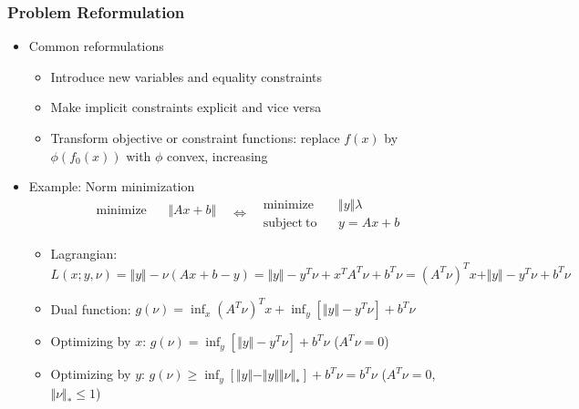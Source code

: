 \subsubsection*{Problem Reformulation}
\begin{itemize}
    \item Common reformulations
    \begin{itemize}
        \item Introduce new variables and equality constraints
        \item Make implicit constraints explicit and vice versa
        \item Transform objective or constraint functions: replace $f(x)$ by $\phi(f_0(x))$ with $\phi$ convex, increasing
    \end{itemize}
    \item Example: Norm minimization
        $$ \begin{aligned}
            \mathrm{minimize}~~&~~\Vert Ax+b \Vert \\ {}
        \end{aligned}~~~\Leftrightarrow~~~\begin{aligned}
            \mathrm{minimize}~~&~~\Vert y\Vert\lambda \\
            \mathrm{subject~to}~~&~~y = Ax + b
        \end{aligned} $$
    \begin{itemize}
        \item Lagrangian: $L(x;y,\nu) = \Vert y\Vert-\nu(Ax+b-y) = \Vert y\Vert-y^T\nu+x^TA^T\nu+b^T\nu = (A^T\nu)^Tx + \Vert y\Vert - y^T\nu + b^T\nu$
        \item Dual function: $g(\nu) = \inf_{x}(A^T\nu)^Tx + \inf_{y}\left[\Vert y\Vert - y^T\nu\right] + b^T\nu$
        \item Optimizing by $x$: $g(\nu) = \inf_{y}\left[\Vert y\Vert - y^T\nu\right] + b^T\nu$ ($A^T\nu = 0$)
        \item Optimizing by $y$: $g(\nu)\geq\inf_{y}\left[\Vert y\Vert - \Vert y\Vert\Vert\nu\Vert_\ast\right]+b^T\nu = b^T\nu$ ($A^T\nu = 0$, $\Vert\nu\Vert_\ast\leq 1$)
    \end{itemize}
\end{itemize}
